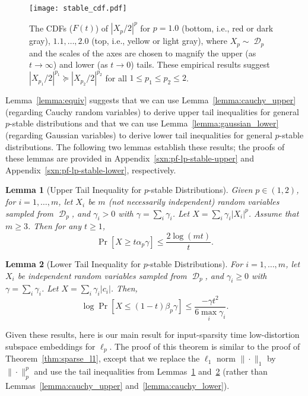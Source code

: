 \documentclass[11pt]{article}
\newtheorem{lemma}{Lemma}
\DeclareMathOperator{\D}{\mathcal{D}}
\begin{document}
\begin{figure}
  \centering
  \texttt{[image: stable\_cdf.pdf]}
\caption{The CDFs ($F(t)$) of $|X_p/2|^p$ for $p = 1.0$ (bottom, i.e., red or
    dark gray), $1.1, \ldots, 2.0$ (top, i.e., yellow or light gray), where $X_p
    \sim \D_p$ and the scales of the axes are chosen to magnify the upper (as $t
    \to \infty$) and lower (as $t \to 0$) tails.
    These empirical results suggest $|X_{p_1}/2|^{p_1} \succeq
    |X_{p_2}/2|^{p_2}$ for all $1 \leq p_1 \leq p_2 \leq 2$.}
  \label{fig:stable_cdf}
\end{figure}

Lemma~\ref{lemma:equiv} suggests that we can use Lemma~\ref{lemma:cauchy_upper}
(regarding Cauchy random variables) to derive upper tail inequalities for
general $p$-stable distributions and that we can use
Lemma~\ref{lemma:gaussian_lower} (regarding Gaussian variables) to derive lower
tail inequalities for general $p$-stable distributions.
The following two lemmas establish these results; the proofs of these lemmas are
provided in Appendix~\ref{sxn:pf-lp-stable-upper} and
Appendix~\ref{sxn:pf-lp-stable-lower}, respectively.

\begin{lemma}[Upper Tail Inequality for $p$-stable Distributions]
  \label{lemma:stable_upper}
  Given $p \in (1, 2)$, for $i=1,\ldots,m$, let $X_i$ be $m$ (not necessarily
  independent) random variables sampled from $\D_p$, and $\gamma_i > 0$ with
  $\gamma = \sum_i \gamma_i$.
  Let $X = \sum_i \gamma_i |X_i|^p$.
  Assume that $m \geq 3$.
  Then for any $t \geq 1$,
  \begin{equation*}
    \Pr[X \geq t \alpha_p \gamma] \leq \frac{2 \log (mt)}{t}.
  \end{equation*}
\end{lemma}

\begin{lemma}[Lower Tail Inequality for $p$-stable Distributions]
  \label{lemma:stable_lower}
  For $i=1,\ldots,m$, let $X_i$ be independent random variables sampled from
  $\D_p$, and $\gamma_i \geq 0$ with $\gamma = \sum_i \gamma_i$. Let $X
  = \sum_i \gamma_i |c_i|$. Then,
  \begin{equation*}
    \log \Pr[X \leq (1-t) \beta_p \gamma] \leq \frac{- \gamma t^2}{6 \max_i \gamma_i}.
  \end{equation*}
\end{lemma}

Given these results, here is our main result for input-sparsity time 
low-distortion subspace embeddings for $\ell_p$.
The proof of this theorem is similar to the proof of 
Theorem~\ref{thm:sparse_l1}, except that we replace the $\ell_1$ norm 
$\|\cdot\|_1$ by $\|\cdot\|_p^p$ and use the tail inequalities from 
Lemmas~\ref{lemma:stable_upper} and~\ref{lemma:stable_lower} (rather than 
Lemmas~\ref{lemma:cauchy_upper} and~\ref{lemma:cauchy_lower}).  
\end{document}
